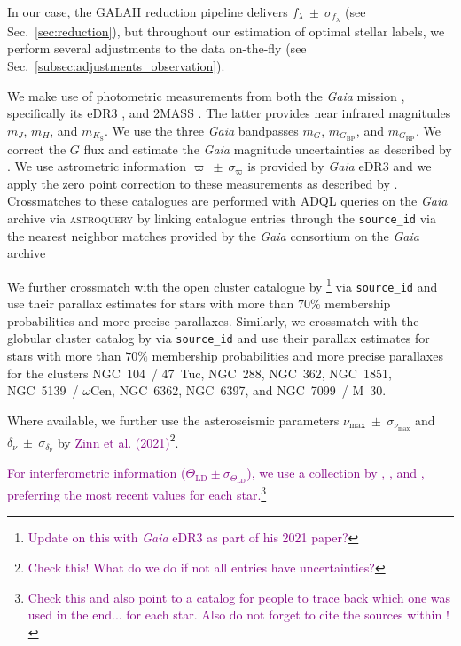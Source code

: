 \documentclass[
  journal=pasa,
  manuscript=research-paper, %
  year=2021,
  volume=37,
]{cup-journal}
\newcommand{\SB}[1]{{\textcolor{purple}{#1}}}
\newcommand{\Gaia}{\textit{Gaia}\xspace}
\begin{document}
In our case, the GALAH reduction pipeline delivers $f_\lambda~\pm~\sigma_{f_\lambda}$ (see Sec.~\ref{sec:reduction}), but throughout our estimation of optimal stellar labels, we perform several adjustments to the data on-the-fly (see Sec.~\ref{subsec:adjustments_observation}).

We make use of photometric measurements from both the \Gaia mission \citep{Gaia-Collaboration2016}, specifically its eDR3 \citep{Brown2021}, and 2MASS \citep{Skrutskie2006}. The latter provides near infrared magnitudes $m_J$, $m_H$, and $m_{K_\text{S}}$. We use the three \Gaia bandpasses $m_G$, $m_{G_\text{BP}}$, and $m_{G_\text{RP}}$. We correct the $G$ flux and estimate the \Gaia magnitude uncertainties as described by \citet{Riello2021}. We use astrometric information $\varpi~\pm~\sigma_\varpi$ is provided by \Gaia eDR3 \citep{Lindegren2021a} and we apply the zero point correction to these measurements as described by \citep{Lindegren2021b}. Crossmatches to these catalogues are performed with \textsc{ADQL} queries on the \Gaia archive via \textsc{astroquery} by linking catalogue entries through the \texttt{source\_id} via the nearest neighbor matches provided by the \Gaia consortium on the \Gaia archive \citep[see][]{Marrese2017, Marrese2019}

We further crossmatch with the open cluster catalogue by \citet{CantatGaudin2020}\footnote{\SB{Update on this with \Gaia eDR3 as part of his 2021 paper?}} via \texttt{source\_id} and use their parallax estimates for stars with more than $70\%$ membership probabilities and more precise parallaxes. Similarly, we crossmatch with the globular cluster catalog by \citet{Vasiliev2021} via \texttt{source\_id} and use their parallax estimates for stars with more than $70\%$ membership probabilities and more precise parallaxes for the clusters NGC~104~/ 47~Tuc, NGC~288, NGC~362, NGC~1851, NGC~5139~/ $\omega$Cen, NGC~6362, NGC~6397, and NGC~7099~/ M~30.

Where available, we further use the asteroseismic parameters $\nu_\text{max}~\pm~\sigma_{\nu_\text{max}}$ and $\delta_\nu~\pm~\sigma_{\delta_\nu}$ by \SB{Zinn et al. (2021)}\footnote{\SB{Check this! What do we do if not all entries have uncertainties?}}.

\SB{For interferometric information ($\Theta_\text{LD} \pm \sigma_{\Theta_\text{LD}}$), we use a collection by \citet{Karovicova2020}, \citet{Karovicova2018}, and \citet{Heiter2015}, preferring the most recent values for each star.\footnote{\SB{Check this and also point to a catalog for people to trace back which one was used in the end... for each star. Also do not forget to cite the sources within \citet{Heiter2015}!}}}
\end{document}
